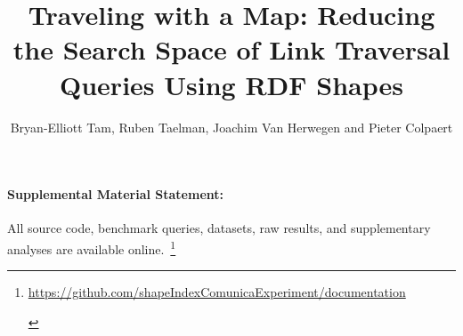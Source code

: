 \documentclass[Afour,sageh,times]{sagej}
\newif\ifanonymous
\begin{document}

\title{Traveling with a Map: Reducing the Search Space of Link Traversal Queries Using RDF Shapes}

\author{Bryan-Elliott Tam, Ruben Taelman, Joachim Van Herwegen and Pieter Colpaert}







\maketitle










\paragraph*{Supplemental Material Statement:}\label{sec:supplementalMaterial} All source code, benchmark queries, datasets, raw results, and supplementary analyses are available online.~\footnote{
    \ifanonymous
       \url{https://anonymous.4open.science/r/documentation-1A65}
    \else
       \url{https://github.com/shapeIndexComunicaExperiment/documentation}
    \fi 
    \label{sf:supplementalMaterial}}



\printbibliography
{}


\end{document}

